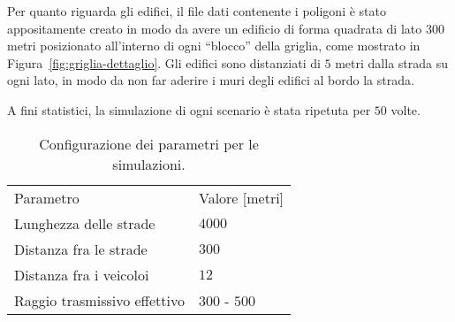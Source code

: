 Per quanto riguarda gli edifici, il file dati contenente i poligoni è stato appositamente creato in modo da avere un edificio di forma quadrata di lato $300$ metri
posizionato all'interno di ogni ``blocco'' della griglia, come mostrato in Figura~\ref{fig:griglia-dettaglio}.
Gli edifici sono distanziati di $5$ metri dalla strada su ogni lato, in modo da non far aderire i muri degli edifici al bordo la strada.

A fini statistici, la simulazione di ogni scenario è stata ripetuta per $50$ volte.
%
\begin{table}
	\centering
	\begin{tabular}{| m{.4\linewidth} | p{.2\linewidth} |}
		\toprule
		Parametro											&			Valore [metri]			\\
		\thickerline
		Lunghezza delle strade				&			$4000$							\\
		Distanza fra le strade				&			$300$								\\
		Distanza fra i veicoloi 			&			$12$ 								\\
		Raggio trasmissivo effettivo	&			$300$ - $500$				\\
		\bottomrule
	\end{tabular}
	\caption{Configurazione dei parametri per le simulazioni.\label{tab:parametri-simulazioni-barichello}}
\end{table}
